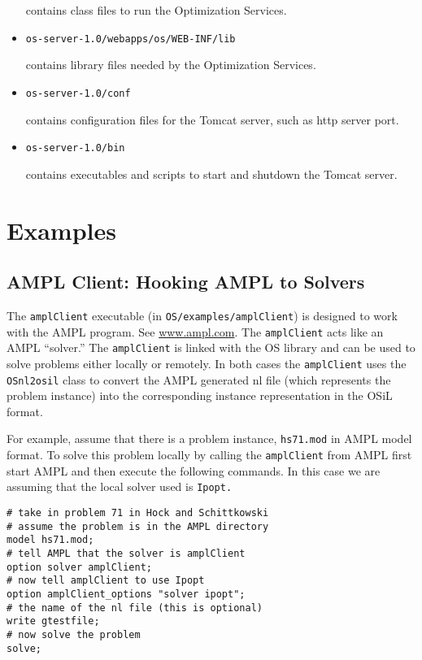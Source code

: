 \documentclass[11pt]{article}
\renewcommand{\_}{{\char"5F}}
\renewcommand{\{}{{\char"7B}}
\renewcommand{\}}{{\char"7D}}
\renewcommand{\^}{{\char"0D}}
\renewcommand{\'}{{\char"0D}}
\begin{document}
\begin{itemize}
\begin{verbatim}
\end{verbatim}
contains class files to run the Optimization Services.
\item
\begin{verbatim}
os-server-1.0/webapps/os/WEB-INF/lib
\end{verbatim}
contains library files needed by the Optimization Services.
\item
\begin{verbatim}
os-server-1.0/conf
\end{verbatim}
contains configuration files for the Tomcat server, such as http server port.
\item
\begin{verbatim}
os-server-1.0/bin
\end{verbatim}
contains executables and scripts to start and shutdown the Tomcat server.
\end{itemize}




\section{Examples}\label{section:examples}

\subsection{AMPL Client:  Hooking AMPL to Solvers}\label{section:amplclient}

The {\tt amplClient} executable (in {\tt OS/examples/amplClient}) is designed to work with the AMPL program. See \url{www.ampl.com}. The {\tt amplClient} acts like an AMPL ``solver.'' The {\tt amplClient} is linked with the OS library and can be used to solve problems either locally or remotely. In both cases the {\tt amplClient} uses the {\tt OSnl2osil} class to convert the AMPL generated nl file (which represents the problem instance) into the corresponding instance representation in the OSiL format.

For example, assume that there is a problem instance, {\tt hs71.mod} in AMPL model format. To solve this problem locally by calling the {\tt amplClient} from AMPL first start AMPL and then execute the following commands. In this case we are assuming that the local solver used is {\tt Ipopt.}

\begin{verbatim}
# take in problem 71 in Hock and Schittkowski
# assume the problem is in the AMPL directory
model hs71.mod;
# tell AMPL that the solver is amplClient
option solver amplClient;
# now tell amplClient to use Ipopt
option amplClient_options "solver ipopt";
# the name of the nl file (this is optional)
write gtestfile;
# now solve the problem
solve;
\end{verbatim}
\end{document}
